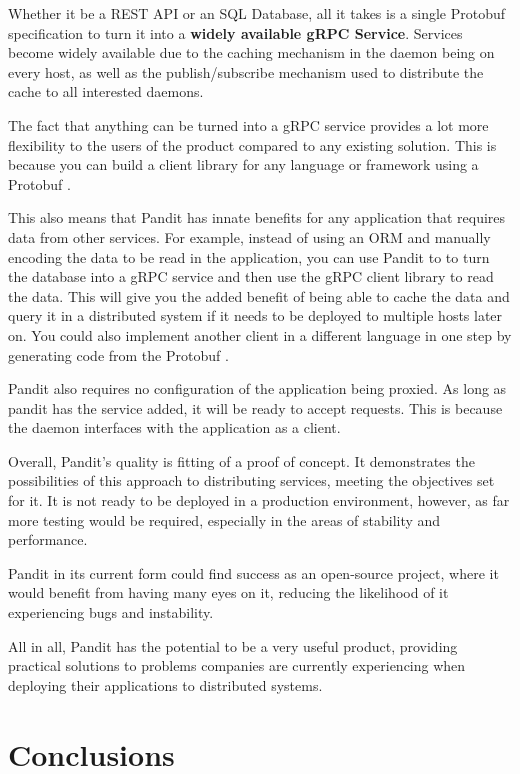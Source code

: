 \documentclass[a4paper,12pt]{report}
\begin{document}
Whether it be a REST API or an SQL Database, all it takes is a single Protobuf specification \cite{protobuf} to turn it into a
\textbf{widely available gRPC \cite{grpc} Service}. Services become widely available due to the caching mechanism in the daemon being on every host,
as well as the publish/subscribe mechanism used to distribute the cache to all interested daemons.

The fact that anything can be turned into a gRPC service provides a lot more flexibility to the users of the product compared to any existing solution.
This is because you can build a client library for any language or framework using a Protobuf \cite{codegen}.

This also means that Pandit has innate benefits for any application that requires data from other services.
For example, instead of using an ORM \cite{orm} and manually encoding the data to be read in the application, you can use Pandit to
to turn the database into a gRPC service and then use the gRPC client library to read the data. This will give you the added benefit of
being able to cache the data and query it in a distributed system if it needs to be deployed to multiple hosts later on.
You could also implement another client in a different language in one step by generating code from the Protobuf \cite{codegen}.

Pandit also requires no configuration of the application being proxied. As long as pandit has the service added, it will be ready to accept requests.
This is because the daemon interfaces with the application as a client.

Overall, Pandit's quality is fitting of a proof of concept. 
It demonstrates the possibilities of this approach to distributing services, meeting the objectives set for it.
It is not ready to be deployed in a production environment, however, as far more testing would be required, especially in the areas of stability and performance.

Pandit in its current form could find success as an open-source project, where it would benefit from having many eyes on it, reducing the likelihood of it experiencing bugs and instability.

All in all, Pandit has the potential to be a very useful product, providing practical solutions to problems companies are currently experiencing when deploying their applications to distributed systems.

\chapter{Conclusions}
\end{document}
